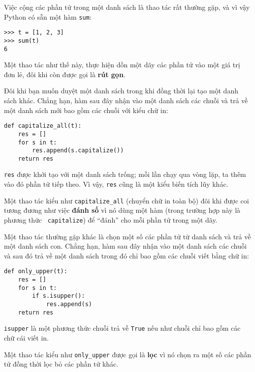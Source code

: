 \documentclass[11pt]{book}
\begin{document}

Việc cộng các phần tử trong một danh sách là thao tác rất 
thường gặp, và vì vậy Python có sẵn một hàm {\tt sum}:

\beforeverb
\begin{verbatim}
>>> t = [1, 2, 3]
>>> sum(t)
6
\end{verbatim}
\afterverb
%
Một thao tác như thế này, thực hiện dồn một dãy các phần tử
vào một giá trị đơn lẻ, đôi khi còn được gọi là {\bf rút gọn}.


Đôi khi bạn muốn duyệt một danh sách trong khi đồng thời lại tạo
một danh sách khác. Chẳng hạn, hàm sau đây nhận vào một danh sách
các chuỗi và trả về một danh sách mới bao gồm các chuỗi với kiểu chữ in:

\beforeverb
\begin{verbatim}
def capitalize_all(t):
    res = []
    for s in t:
        res.append(s.capitalize())
    return res
\end{verbatim}
\afterverb
%
{\tt res} được khởi tạo với một danh sách trống; mỗi lần chạy qua 
vòng lặp, ta thêm vào đó phần tử tiếp theo. Vì vậy, {\tt res} cũng
là một kiểu biến tích lũy khác.


Một thao tác kiểu như \verb"capitalize_all" (chuyển chữ in toàn bộ) 
đôi khi được coi tương đương như việc {\bf 
đánh số} vì nó dùng một hàm (trong trường hợp này là phương thức {\tt
capitalize}) để ``đánh'' cho mỗi phần tử trong một dãy.


Một thao tác thường gặp khác là chọn một số các phần tử từ danh sách
và trả về một danh sách con. Chẳng hạn, hàm sau đây nhận vào một danh sách
các chuỗi và sau đó trả về một danh sách trong đó chỉ bao gồm các
chuỗi viết bằng chữ in:

\beforeverb
\begin{verbatim}
def only_upper(t):
    res = []
    for s in t:
        if s.isupper():
            res.append(s)
    return res
\end{verbatim}
\afterverb
%
{\tt isupper} là một phương thức chuỗi trả về {\tt True} nếu như chuỗi
chỉ bao gồm các chữ cái viết in.

Một thao tác kiểu như \verb"only_upper" được gọi là {\bf lọc} vì nó chọn
ra một số các phần tử đồng thời lọc bỏ các phần tử khác.
\end{document}
